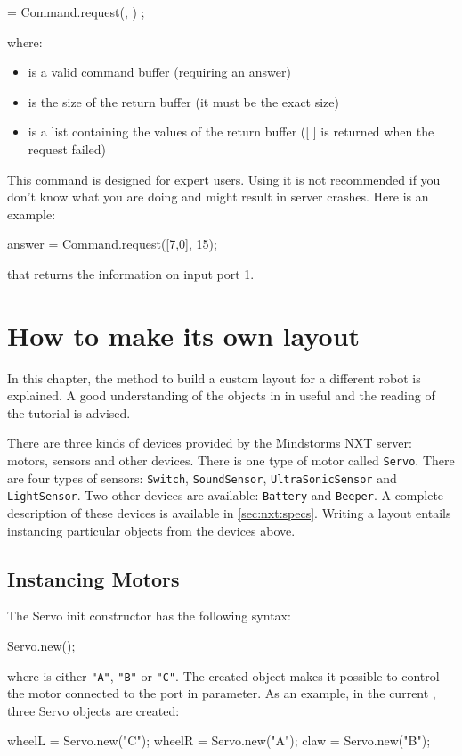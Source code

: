 \begin{urbiunchecked}
 = Command.request(, ) ;
\end{urbiunchecked}

where:
\begin{itemize}
\item {} is a valid command buffer (requiring an answer)
\item {} is the size of the return buffer (it must be the exact
  size)
\item {} is a list containing the values of the return buffer ([ ]
  is returned when the request failed)
\end{itemize}

This command is designed for expert users. Using it is not recommended if you
don't know what you are doing and might result in server crashes.
Here is an example:
\begin{urbiunchecked}
answer = Command.request([7,0], 15);
\end{urbiunchecked}

that returns the information on input port 1.

\section{How to make its own layout}

In this chapter, the method to build a custom layout for a different robot
is explained. A good understanding of the objects in \urbi in useful and the
reading of the \urbi tutorial is advised.

There are three kinds of devices provided by the Mindstorms NXT server:
motors, sensors and other devices. There is one type of motor called
\lstinline{Servo}. There are four types of sensors: \lstinline{Switch},
\lstinline{SoundSensor}, \lstinline{UltraSonicSensor} and
\lstinline{LightSensor}. Two other devices are available:
\lstinline{Battery} and \lstinline{Beeper}. A complete description of these
devices is available in \autoref{sec:nxt:specs}.  Writing a layout entails
instancing particular objects from the devices above.

\subsection{Instancing Motors}
The Servo init constructor has the following syntax:
\begin{urbiunchecked}
Servo.new();
\end{urbiunchecked}
\noindent
where  is either \lstinline{"A"}, \lstinline{"B"} or
\lstinline{"C"}. The created object makes it possible to control the motor
connected to the port in parameter.  As an example, in the current
, three Servo objects are created:
\begin{urbiunchecked}
wheelL = Servo.new("C");
wheelR = Servo.new("A");
claw = Servo.new("B");
\end{urbiunchecked}

